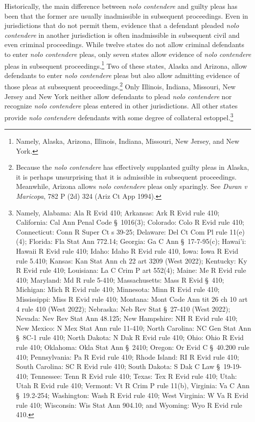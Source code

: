 Historically, the main difference between \textit{nolo contendere} and guilty pleas has been that the former are usually inadmissible in subsequent proceedings. Even in jurisdictions that do not permit them, evidence that a defendant pleaded \textit{nolo contendere} in another jurisdiction is often inadmissible in subsequent civil and even criminal proceedings. While twelve states do not allow criminal defendants to enter \textit{nolo contendere} pleas, only seven states allow evidence of \textit{nolo contendere} pleas in subsequent proceedings.\footnote{Namely, Alaska, Arizona, Illinois, Indiana, Missouri, New Jersey, and New York.} Two of these states, Alaska and Arizona, allow defendants to enter \textit{nolo contendere} pleas but also allow admitting evidence of those pleas at subsequent proceedings.\footnote{Because the \textit{nolo contendere} has effectively supplanted guilty pleas in Alaska, it is perhaps unsurprising that it is admissible in subsequent proceedings. Meanwhile, Arizona allows \textit{nolo contendere} pleas only sparingly. See \textit{Duran v Maricopa}, 782 P (2d) 324 (Ariz Ct App 1994).} Only Illinois, Indiana, Missouri, New Jersey and New York neither allow defendants to plead \textit{nolo contendere} nor recognize \textit{nolo contendere} pleas entered in other jurisdictions. All other states provide \textit{nolo contendere} defendants with some degree of collateral estoppel.\footnote{Namely, Alabama: Ala R Evid 410; Arkansas: Ark R Evid rule 410; California: Cal Ann Penal Code § 1016(3); Colorado: Colo R Evid rule 410; Connecticut: Conn R Super Ct s 39-25; Delaware: Del Ct Com Pl rule 11(e)(4); Florida: Fla Stat Ann 772.14; Georgia: Ga C Ann § 17-7-95(c); Hawai'i: Hawaii R Evid rule 410; Idaho: Idaho R Evid rule 410, Iowa: Iowa R Evid rule 5.410; Kansas: Kan Stat Ann ch 22 art 3209 (West 2022); Kentucky: Ky R Evid rule 410; Louisiana: La C Crim P art 552(4); Maine: Me R Evid rule 410; Maryland: Md R rule 5-410; Massachusetts: Mass R Evid § 410; Michigan: Mich R Evid rule 410; Minnesota: Minn R Evid rule 410; Mississippi: Miss R Evid rule 410; Montana: Mont Code Ann tit 26 ch 10 art 4 rule 410 (West 2022); Nebraska: Neb Rev Stat § 27-410 (West 2022); Nevada: Nev Rev Stat Ann 48.125; New Hampshire: NH R Evid rule 410; New Mexico: N Mex Stat Ann rule 11-410; North Carolina: NC Gen Stat Ann § 8C-1 rule 410; North Dakota: N Dak R Evid rule 410; Ohio: Ohio R Evid rule 410; Oklahoma: Okla Stat Ann § 2410; Oregon: Or Evid C § 40.200 rule 410; Pennsylvania: Pa R Evid rule 410; Rhode Island: RI R Evid rule 410; South Carolina: SC R Evid rule 410; South Dakota: S Dak C Law § 19-19-410; Tennessee: Tenn R Evid rule 410; Texas: Tex R Evid rule 410; Utah: Utah R Evid rule 410; Vermont: Vt R Crim P rule 11(b), Virginia: Va C Ann § 19.2-254; Washington: Wash R Evid rule 410; West Virginia: W Va R Evid rule 410; Wisconsin: Wis Stat Ann 904.10; and Wyoming: Wyo R Evid rule 410.}

